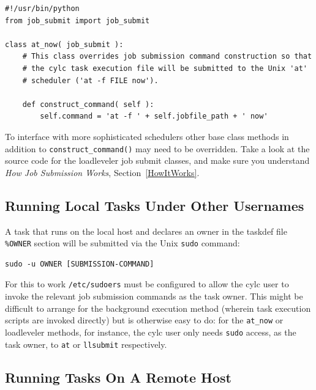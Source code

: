 \documentclass[11pt,a4paper]{article}
\begin{document}
\lstset{language=Python}

\begin{lstlisting}
#!/usr/bin/python
from job_submit import job_submit

class at_now( job_submit ):
    # This class overrides job submission command construction so that
    # the cylc task execution file will be submitted to the Unix 'at'
    # scheduler ('at -f FILE now').

    def construct_command( self ):
        self.command = 'at -f ' + self.jobfile_path + ' now'
\end{lstlisting}

To interface with more sophisticated schedulers other base class methods
in addition to \lstinline=construct_command()= may need to be overridden.
Take a look at the source code for the loadleveler job submit classes,
and make sure you understand {\em How Job Submission Works},
Section~\ref{HowItWorks}.

\subsection{Running Local Tasks Under Other Usernames}
\label{RunningLocalTasksUnderOtherUsernames}

\lstset{language=cylctaskdef}

A task that runs on the local host and declares an owner in the taskdef
file \lstinline=%OWNER= section will be submitted via the Unix
\lstinline=sudo= command:  

\lstset{language=bash}

\begin{lstlisting}
sudo -u OWNER [SUBMISSION-COMMAND]
\end{lstlisting}

For this to work \lstinline=/etc/sudoers= must be configured to allow
the cylc user to invoke the relevant job submission commands as the task
owner.  This might be difficult to arrange for the background execution
method (wherein task execution scripts are invoked directly) but is
otherwise easy to do: for the \lstinline=at_now= or loadleveler methods,
for instance, the cylc user only needs \lstinline=sudo= access, as the
task owner, to \lstinline=at= or \lstinline=llsubmit= respectively.

\subsection{Running Tasks On A Remote Host}
\label{RunningTasksOnARemoteHost}
\end{document}
